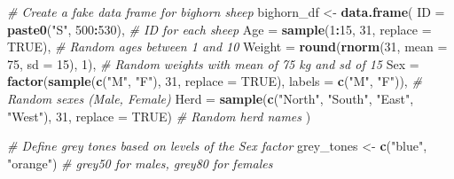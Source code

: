 \documentclass[
]{book}
\newenvironment{Shaded}{\begin{snugshade}}{\end{snugshade}}
\newcommand{\AttributeTok}[1]{\textcolor[rgb]{0.13,0.29,0.53}{#1}}
\newcommand{\CommentTok}[1]{\textcolor[rgb]{0.56,0.35,0.01}{\textit{#1}}}
\newcommand{\ConstantTok}[1]{\textcolor[rgb]{0.56,0.35,0.01}{#1}}
\newcommand{\DecValTok}[1]{\textcolor[rgb]{0.00,0.00,0.81}{#1}}
\newcommand{\FunctionTok}[1]{\textcolor[rgb]{0.13,0.29,0.53}{\textbf{#1}}}
\newcommand{\NormalTok}[1]{#1}
\newcommand{\OtherTok}[1]{\textcolor[rgb]{0.56,0.35,0.01}{#1}}
\newcommand{\SpecialCharTok}[1]{\textcolor[rgb]{0.81,0.36,0.00}{\textbf{#1}}}
\newcommand{\StringTok}[1]{\textcolor[rgb]{0.31,0.60,0.02}{#1}}
\begin{document}
\begin{Shaded}
\begin{Highlighting}[]
\CommentTok{\# Create a fake data frame for bighorn sheep}
\NormalTok{bighorn\_df }\OtherTok{\textless{}{-}} \FunctionTok{data.frame}\NormalTok{(}
  \AttributeTok{ID =} \FunctionTok{paste0}\NormalTok{(}\StringTok{"S"}\NormalTok{, }\DecValTok{500}\SpecialCharTok{:}\DecValTok{530}\NormalTok{),      }\CommentTok{\# ID for each sheep}
  \AttributeTok{Age =} \FunctionTok{sample}\NormalTok{(}\DecValTok{1}\SpecialCharTok{:}\DecValTok{15}\NormalTok{, }\DecValTok{31}\NormalTok{, }\AttributeTok{replace =} \ConstantTok{TRUE}\NormalTok{),  }\CommentTok{\# Random ages between 1 and 10}
  \AttributeTok{Weight =} \FunctionTok{round}\NormalTok{(}\FunctionTok{rnorm}\NormalTok{(}\DecValTok{31}\NormalTok{, }\AttributeTok{mean =} \DecValTok{75}\NormalTok{, }\AttributeTok{sd =} \DecValTok{15}\NormalTok{), }\DecValTok{1}\NormalTok{),  }\CommentTok{\# Random weights with mean of 75 kg and sd of 15}
  \AttributeTok{Sex =} \FunctionTok{factor}\NormalTok{(}\FunctionTok{sample}\NormalTok{(}\FunctionTok{c}\NormalTok{(}\StringTok{"M"}\NormalTok{, }\StringTok{"F"}\NormalTok{), }\DecValTok{31}\NormalTok{, }\AttributeTok{replace =} \ConstantTok{TRUE}\NormalTok{), }\AttributeTok{labels =} \FunctionTok{c}\NormalTok{(}\StringTok{"M"}\NormalTok{, }\StringTok{"F"}\NormalTok{)),     }\CommentTok{\# Random sexes (Male, Female)}
  \AttributeTok{Herd =} \FunctionTok{sample}\NormalTok{(}\FunctionTok{c}\NormalTok{(}\StringTok{"North"}\NormalTok{, }\StringTok{"South"}\NormalTok{, }\StringTok{"East"}\NormalTok{, }\StringTok{"West"}\NormalTok{), }\DecValTok{31}\NormalTok{, }\AttributeTok{replace =} \ConstantTok{TRUE}\NormalTok{)  }\CommentTok{\# Random herd names}
\NormalTok{)}

\CommentTok{\# Define grey tones based on levels of the \textquotesingle{}Sex\textquotesingle{} factor}
\NormalTok{grey\_tones }\OtherTok{\textless{}{-}} \FunctionTok{c}\NormalTok{(}\StringTok{"blue"}\NormalTok{, }\StringTok{"orange"}\NormalTok{)  }\CommentTok{\# grey50 for males, grey80 for females}
\end{Highlighting}
\end{Shaded}
\end{document}
